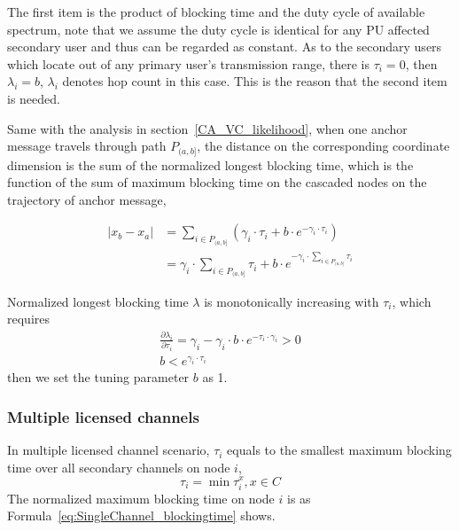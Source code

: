 The first item is the product of blocking time and the duty cycle of available spectrum, note that we assume the duty cycle is identical for any PU affected secondary user and thus can be regarded as constant.
As to the secondary users which locate out of any primary user's transmission range, there is $\tau_i=0$, then $\lambda_i=b$, $\lambda_i$ denotes hop count in this case.
This is the reason that the second item is needed.

Same with the analysis in section~\ref{CA_VC_likelihood}, when one anchor message travels through path $P_{(a,b]}$, the distance on the corresponding coordinate dimension is the sum of the normalized longest blocking time, which is the function of the sum of maximum blocking time on the cascaded nodes on the trajectory of anchor message,

\begin{equation}
\label{distance2}
\begin{split}
|x_b-x_a| & =  \sum_{i\in P_{(a,b]}} (\gamma_i\cdot \tau_i + b\cdot e^{-\gamma_i\cdot \tau_i}) \\
		  & = \gamma_i\cdot \sum_{i\in P_{(a,b]}}\tau_i + b\cdot e^{-\gamma_i\cdot \sum_{i\in P_{(a,b]}}\tau_i}
\end{split}
\end{equation}


Normalized longest blocking time $\lambda$ is monotonically increasing with $\tau_i$, which requires
\begin{equation}
\begin{split}
\frac{\partial\lambda_i}{\partial\tau_i}=\gamma_i-\gamma_i\cdot b\cdot e^{-\tau_i\cdot \gamma_i}  >0\\
b  < e^{\gamma_i\cdot \tau_i}
\end{split}
\end{equation}
then we set the tuning parameter $b$ as 1.

\subsubsection*{Multiple licensed channels}
In multiple licensed channel scenario, $\tau_i$ equals to the smallest maximum blocking time over all secondary channels on node $i$, 
\begin{equation}
\tau_i = \min \tau_i^x, x\in C
\end{equation}
The normalized maximum blocking time on node $i$ is as Formula~\ref{eq:SingleChannel_blockingtime} shows.

